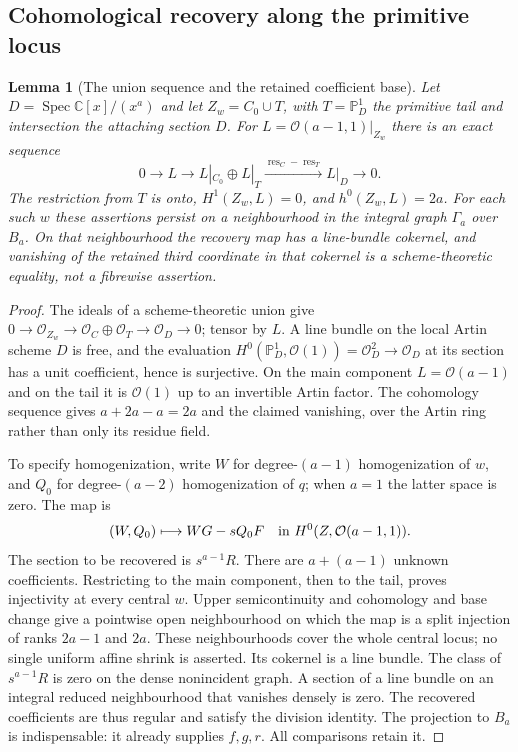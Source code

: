 \documentclass[11pt,reqno]{amsart}
\numberwithin{equation}{section}
\newtheorem{lemma}[theorem]{Lemma}
\theoremstyle{definition}\newtheorem{definition}[theorem]{Definition}
\theoremstyle{remark}\newtheorem{remark}[theorem]{Remark}
\newcommand{\C}{\mathbb C}\newcommand{\Q}{\mathbb Q}
\newcommand{\Pj}{\mathbb P}\newcommand{\A}{\mathbb A}
\newcommand{\OO}{\mathcal O}\newcommand{\II}{\mathcal I}
\DeclareMathOperator{\Spec}{Spec}\DeclareMathOperator{\PGL}{PGL}
\begin{document}
\subsection{Cohomological recovery along the primitive locus}
\begin{lemma}[The union sequence and the retained coefficient base]
\label{lem:recovery-details-v163}
Let $D=\Spec\C[x]/(x^a)$ and let $Z_w=C_0\cup T$, with
$T=\Pj^1_D$ the primitive tail and intersection the attaching
section $D$. For $L=\OO(a-1,1)|_{Z_w}$ there is an exact sequence
\begin{equation}\label{eq:union-cohomology-v163}
 0\to L\to L|_{C_0}\oplus L|_T\xrightarrow{\operatorname{res}_C-
 \operatorname{res}_T}L|_D\to0.
\end{equation}
The restriction from $T$ is onto, $H^1(Z_w,L)=0$, and
$h^0(Z_w,L)=2a$. For each such $w$ these assertions persist on a
neighbourhood in the integral graph $\Gamma_a$ over $B_a$. On that
neighbourhood the recovery map has a line-bundle cokernel, and
vanishing of the retained third coordinate in that cokernel is a
scheme-theoretic equality, not a fibrewise assertion.
\end{lemma}
\begin{proof}
The ideals of a scheme-theoretic union give
$0\to\OO_{Z_w}\to\OO_C\oplus\OO_T\to\OO_D\to0$; tensor by
$L$. A line bundle on the local Artin scheme $D$ is free, and the
evaluation $H^0(\Pj^1_D,\OO(1))=\OO_D^2\to\OO_D$ at its section
has a unit coefficient, hence is surjective. On the main component
$L=\OO(a-1)$ and on the tail it is $\OO(1)$ up to an invertible
Artin factor. The cohomology sequence gives $a+2a-a=2a$ and the
claimed vanishing, over the Artin ring rather than only its residue
field.

To specify homogenization, write $W$ for degree-$(a-1)$ homogenization
of $w$, and $Q_0$ for degree-$(a-2)$ homogenization of $q$; when
$a=1$ the latter space is zero. The map is
\[
 (W,Q_0)\longmapsto WG-sQ_0F
       \quad\hbox{in }H^0(Z,\OO(a-1,1)).
\]
The section to be recovered is $s^{a-1}R$. There are $a+(a-1)$
unknown coefficients. Restricting to the main component, then to
the tail, proves injectivity at every central $w$. Upper
semicontinuity and cohomology and base change give a pointwise open
neighbourhood on which the map is a split injection of ranks
$2a-1$ and $2a$. These neighbourhoods cover the whole central
locus; no single uniform affine shrink is asserted. Its cokernel
is a line bundle. The class of $s^{a-1}R$ is zero on the dense
nonincident graph. A section of a line bundle on an integral
reduced neighbourhood that vanishes densely is zero. The recovered
coefficients are thus regular and satisfy the division identity.
The projection to $B_a$ is indispensable: it already supplies
$f,g,r$. All comparisons retain it.
\end{proof}
\end{document}
